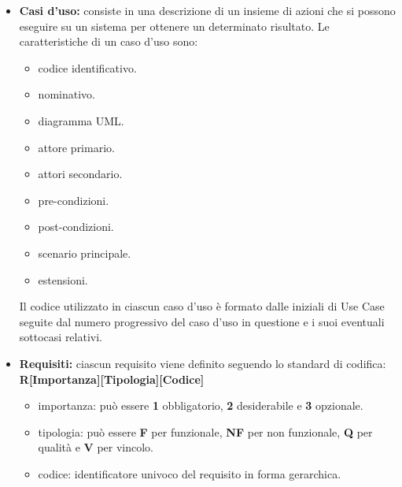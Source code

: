     \begin{itemize}
        \item \textbf{Casi d'uso:} consiste in una descrizione di un insieme di azioni che si possono eseguire su un sistema per ottenere un determinato risultato.
        Le caratteristiche di un caso d'uso sono:
        \begin{itemize}
            \item {codice identificativo.}
            \item {nominativo.}
            \item {diagramma UML.}
            \item {attore primario.}
            \item {attori secondario.}
            \item {pre-condizioni.}
            \item {post-condizioni.}
            \item {scenario principale.}
            \item {estensioni.}
        \end{itemize}
        Il codice utilizzato in ciascun caso d'uso è formato dalle iniziali di Use Case seguite dal numero progressivo del caso d'uso in questione e i suoi eventuali sottocasi relativi.
        \item \textbf{Requisiti:} ciascun requisito viene definito seguendo lo standard di codifica:\\
        \textbf{R[Importanza][Tipologia][Codice]}
        \begin {itemize}
            \item{importanza:} può essere \textbf{1} obbligatorio, \textbf{2} desiderabile e \textbf{3} opzionale.
            \item {tipologia:} può essere \textbf{F} per funzionale, \textbf{NF} per non funzionale, \textbf{Q} per qualità e \textbf{V} per vincolo.
            \item {codice:} identificatore univoco del requisito in forma gerarchica.
        \end {itemize}
    \end{itemize}

